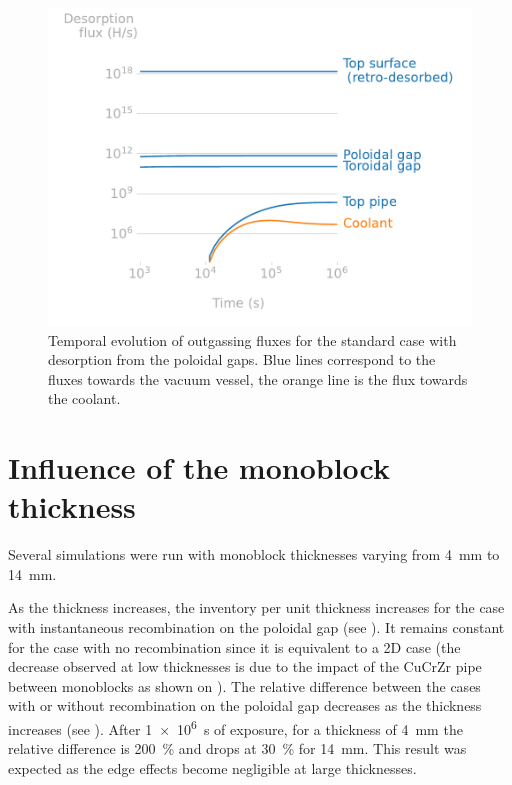 \begin{figure} [h]
    \centering
    \includegraphics[width=\linewidth]{Figures/Chapter3/monoblocks/3D_monoblocks/desorption_flux_standard_case.pdf}
    \caption{Temporal evolution of outgassing fluxes for the standard case with desorption from the poloidal gaps. Blue lines correspond to the fluxes towards the vacuum vessel, the orange line is the flux towards the coolant.}
\end{figure}

\section{Influence of the monoblock thickness}

Several simulations were run with monoblock thicknesses varying from \SI{4}{mm} to \SI{14}{mm}.

As the thickness increases, the inventory per unit thickness increases for the case with instantaneous recombination on the poloidal gap (see ).
It remains constant for the case with no recombination since it is equivalent to a 2D case (the decrease observed at low thicknesses is due to the impact of the CuCrZr pipe between monoblocks as shown on ).
The relative difference between the cases with or without recombination on the poloidal gap decreases as the thickness increases (see ).
After \SI{1e6}{s} of exposure, for a thickness of \SI{4}{mm} the relative difference is \SI{200}{\%} and drops at \SI{30}{\%} for \SI{14}{mm}.
This result was expected as the edge effects become negligible at large thicknesses.

